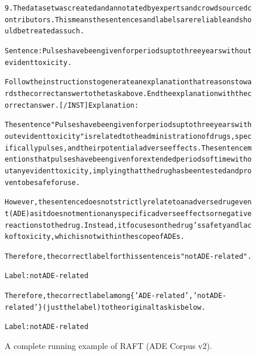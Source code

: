 \begin{figure}[t]
{{\begin{alltt}
9. The dataset was created and annotated by experts and crowdsourced contributors. This means the sentences and labels are reliable and should be treated as such.

Sentence: Pulses have been given for periods up to three years without evident toxicity.

Follow the instructions to generate an explanation that reasons towards the correct answer to the task above. End the explanation with the correct answer. [/INST] Explanation: 

The sentence "Pulses have been given for periods up to three years without evident toxicity" is related to the administration of drugs, specifically pulses, and their potential adverse effects. The sentence mentions that pulses have been given for extended periods of time without any evident toxicity, implying that the drug has been tested and proven to be safe for use.

However, the sentence does not strictly relate to an adverse drug event (ADE) as it does not mention any specific adverse effects or negative reactions to the drug. Instead, it focuses on the drug's safety and lack of toxicity, which is not within the scope of ADEs.

Therefore, the correct label for this sentence is "not ADE-related".

Label: not ADE-related

Therefore, the correct label among \{'ADE-related', 'not ADE-related'\} (just the label) to the original task is below.

Label: not ADE-related
\end{alltt}
}}
\caption{A complete running example of RAFT (ADE Corpus v2).}
\label{fig:raft_subset=ade_corpus_v2_example}
\end{figure}
